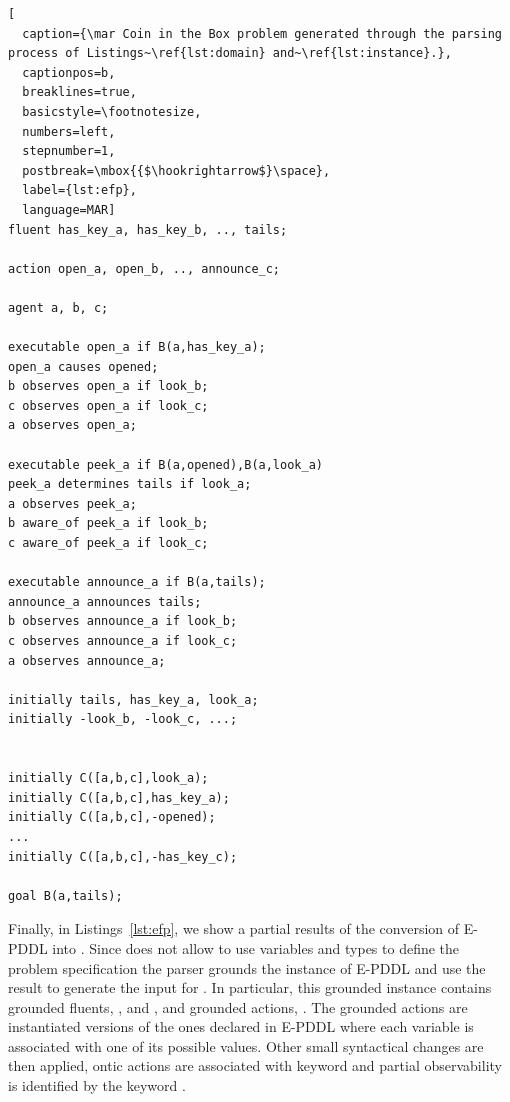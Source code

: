 \begin{minipage}{1.0\linewidth}
\begin{lstlisting}[
  caption={\mar Coin in the Box problem generated through the parsing process of Listings~\ref{lst:domain} and~\ref{lst:instance}.},
  captionpos=b,
  breaklines=true,
  basicstyle=\footnotesize,
  numbers=left,
  stepnumber=1,
  postbreak=\mbox{{$\hookrightarrow$}\space},
  label={lst:efp},
  language=MAR]
fluent has_key_a, has_key_b, .., tails;

action open_a, open_b, .., announce_c;

agent a, b, c;

executable open_a if B(a,has_key_a);
open_a causes opened;
b observes open_a if look_b;
c observes open_a if look_c;
a observes open_a;

executable peek_a if B(a,opened),B(a,look_a)
peek_a determines tails if look_a;
a observes peek_a;
b aware_of peek_a if look_b;
c aware_of peek_a if look_c;

executable announce_a if B(a,tails);
announce_a announces tails;
b observes announce_a if look_b;
c observes announce_a if look_c;
a observes announce_a;

initially tails, has_key_a, look_a;
initially -look_b, -look_c, ...;


initially C([a,b,c],look_a);
initially C([a,b,c],has_key_a);
initially C([a,b,c],-opened);
...
initially C([a,b,c],-has_key_c);

goal B(a,tails);
\end{lstlisting}
\end{minipage}


Finally, in Listings~\ref{lst:efp}, we show a partial results of the conversion of E-PDDL into \mar.
Since \mar does not allow to use variables and types to define the problem specification the parser grounds the instance of E-PDDL and use the result to generate the input for \EFP.
In particular, this grounded instance contains grounded fluents, \eg {},  and , and grounded actions, \eg {}. %
The grounded actions are instantiated versions of the ones declared in E-PDDL where each variable is associated with one of its possible values.
Other small syntactical changes are then applied, \eg ontic actions are associated with keyword  and partial observability is identified by the keyword .
